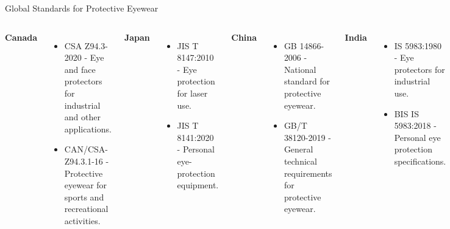 \begin{frame}[shrink=60, plain]{Global Standards for Protective Eyewear}
\begin{columns}
        \textbf{Canada}
        \begin{itemize}
            \item CSA Z94.3-2020 - Eye and face protectors for industrial and other applications.
            \item CAN/CSA-Z94.3.1-16 - Protective eyewear for sports and recreational activities.
        \end{itemize}
    
        \textbf{Japan}
        \begin{itemize}
            \item JIS T 8147:2010 - Eye protection for laser use.
            \item JIS T 8141:2020 - Personal eye-protection equipment.
        \end{itemize}
    
        \textbf{China}
        \begin{itemize}
            \item GB 14866-2006 - National standard for protective eyewear.
            \item GB/T 38120-2019 - General technical requirements for protective eyewear.
        \end{itemize}
    
        \textbf{India}
        \begin{itemize}
            \item IS 5983:1980 - Eye protectors for industrial use.
            \item BIS IS 5983:2018 - Personal eye protection specifications.
        \end{itemize}
    
        \textbf{South Africa}
        \begin{itemize}
            \item SANS 1404:2020 - Eye and face protection.
        \end{itemize}
    
        \textbf{Brazil}
        \begin{itemize}
            \item ABNT NBR 9737:2016 - Eye and face protection for industrial and general use.
        \end{itemize}
    \end{columns}
    \end{frame}
    